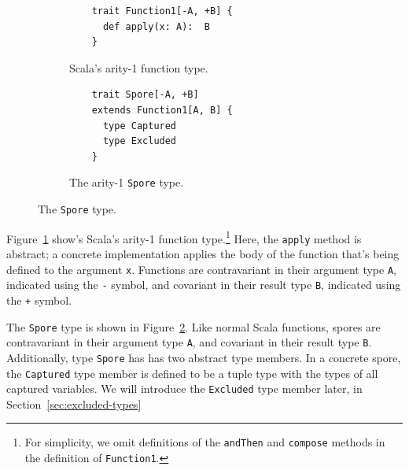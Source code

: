 \documentclass{llncs}
\begin{document}
\begin{figure}[b!]
\begin{subfigure}{.5\textwidth}
  \centering
  \begin{lstlisting}
    trait Function1[-A, +B] {
      def apply(x: A):  B
    }
  \end{lstlisting}
  \caption{Scala's arity-1 function type.}
  \label{fig:function-arity1}
\end{subfigure}%
\begin{subfigure}{.5\textwidth}
  \centering
  \begin{lstlisting}
    trait Spore[-A, +B]
    extends Function1[A, B] {
      type Captured
      type Excluded
    }
  \end{lstlisting}
  \caption{The arity-1 \texttt{Spore} type.}
  \label{fig:spore-arity1}
\end{subfigure}%
\vspace{1mm}
\caption{The \texttt{Spore} type.}
\label{fig:spore-type}
\end{figure}

Figure~\ref{fig:function-arity1} show's Scala's arity-1 function type.\footnote{For simplicity, we omit definitions of the \verb+andThen+ and \verb+compose+ methods in the definition of \verb+Function1+.}
Here, the \verb|apply| method is abstract; a concrete implementation applies
the body of the function that's being defined to the argument \verb|x|.
Functions are contravariant in their argument type \verb|A|, indicated using
the \verb|-| symbol, and covariant in their result type \verb|B|, indicated
using the \verb|+| symbol.






The \verb|Spore| type is shown in Figure~\ref{fig:spore-arity1}. Like normal
Scala functions, spores are contravariant in their argument type \verb|A|, and
covariant in their result type \verb|B|. Additionally, type \verb|Spore| has
has two abstract type members. In a concrete spore, the \verb|Captured| type
member is defined to be a tuple type with the types of all captured variables.
We will introduce the \verb|Excluded| type member later, in Section~\ref{sec:excluded-types}
\end{document}
